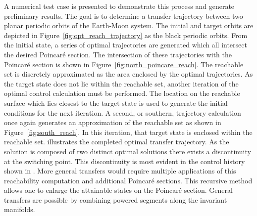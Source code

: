 A numerical test case is presented to demonstrate this process and generate preliminary results.
The goal is to determine a transfer trajectory between two planar periodic orbits of the Earth-Moon system. 
The initial and target orbits are depicted in Figure~\ref{fig:opt_reach_trajectory} as the black periodic orbits.
From the initial state, a series of optimal trajectories are generated which all intersect the desired Poincar\'e section.
The intersection of these trajectories with the Poincar\'e section is shown in Figure~\ref{fig:north_poincare_reach}.
The reachable set is discretely approximated as the area enclosed by the optimal trajectories.
As the target state does not lie within the reachable set, another iteration of the optimal control calculation must be performed. 
The location on the reachable surface which lies closest to the target state is used to generate the initial conditions for the next iteration.
A second, or southern, trajectory calculation once again generates an approximation of the reachable set as shown in Figure~\ref{fig:south_reach}.
In this iteration, that target state is enclosed within the reachable set. 
 illustrates the completed optimal transfer trajectory.
As the solution is composed of two distinct optimal solutions there exists a discontinuity at the switching point.
This discontinuity is most evident in the control history shown in .
More general transfers would require multiple applications of this reachability computation and additional Poincar\'e sections.
This recursive method allows one to enlarge the attainable states on the Poincar\'e section.
General transfers are possible by combining powered segments along the invariant manifolds.
